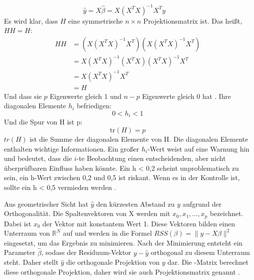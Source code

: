 \begin{equation}
\hat{y} = X \hat{\beta} = X(X^T X)^{-1} X^T y \quad 
\label{hutmatrix}
\end{equation}
Es wird klar, dass \(H\) eine symmetrische \( n \times n \) Projektionsmatrix ist. Das heißt, \( HH = H \): 
\begin{equation}
\begin{aligned}
H H &= \left( X (X^T X)^{-1} X^T \right) \left( X (X^T X)^{-1} X^T \right) \\
&= X (X^T X)^{-1} (X^T X) (X^T X)^{-1} X^T \\
&= X (X^T X)^{-1} X^T \\
&= H
\end{aligned}
\label{eq:idempotent}
\end{equation}
Und dass sie \(p\) Eigenwerte gleich 1 und \( n - p \) Eigenwerte gleich 0 hat \cite{huber1981robust}. Ihre diagonalen Elemente \(h_i\) befriedigen:
\begin{equation}
0 < h_i < 1  \label{eq:hi_condition}
\end{equation}
Und die Spur von H ist p: 
\begin{equation}
\text{tr}(H) = p \label{eq:trace_H}
\end{equation}
\(tr(H)\) ist die Summe der diagonalen Elemente von H. Die diagonalen Elemente enthalten wichtige Informationen. Ein großer \(h_i\)-Wert weist auf eine Warnung hin und bedeutet, dass die \(i\)-te Beobachtung einen entscheidenden, aber nicht überprüfbaren Einfluss haben könnte. Ein h < 0,2 scheint unproblematisch zu sein, ein h-Wert zwischen 0,2 und 0,5 ist riskant. Wenn es in der Kontrolle ist, sollte ein h < 0,5 vermieden werden \cite{huber1981robust}. \par
Aus geometrischer Sicht hat \(\hat{y}\) den kürzesten Abstand zu \(y\) aufgrund der Orthogonalität. Die Spaltenvektoren von X werden mit \(x_0, x_1, \ldots, x_p\) bezeichnet. Dabei ist \(x_0\) der Vektor mit konstantem Wert 1. Diese Vektoren bilden einen Unterraum von $\mathbb{R}^N$ auf und werden in die Formel \( RSS(\beta) = \|y - X\beta\|^2 \) eingesetzt, um das Ergebnis zu minimieren. Nach der Minimierung entsteht ein Parameter $\hat{\beta}$, sodass der Residuum-Vektor \(y-\hat{y}\) orthogonal zu diesem Unterraum steht. Daher stellt \(\hat{y}\) die orthogonale Projektion von \(y\) dar. Die -Matrix berechnet diese orthogonale Projektion, daher wird sie auch Projektionsmatrix genannt \cite{hastie2009elements}. 
